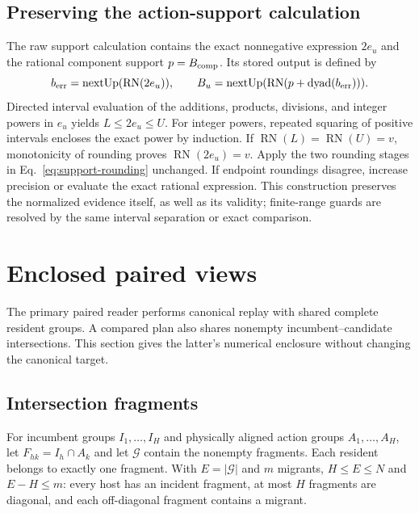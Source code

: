 \documentclass[11pt]{article}
\begin{document}
\subsection{Preserving the action-support calculation}
The raw support calculation contains the exact nonnegative expression $2e_u$ and the rational component support $p=B_{\rm comp}$. Its stored output is defined by
\begin{equation}
b_{\rm err}=\operatorname{nextUp}(\operatorname{RN}(2e_u)),\qquad
B_u=\operatorname{nextUp}(\operatorname{RN}(p+\operatorname{dyad}(b_{\rm err}))).
\label{eq:support-rounding}
\end{equation}
Directed interval evaluation of the additions, products, divisions, and integer powers in $e_u$ yields $L\le2e_u\le U$. For integer powers, repeated squaring of positive intervals encloses the exact power by induction. If $\operatorname{RN}(L)=\operatorname{RN}(U)=v$, monotonicity of rounding proves $\operatorname{RN}(2e_u)=v$. Apply the two rounding stages in Eq.~\eqref{eq:support-rounding} unchanged. If endpoint roundings disagree, increase precision or evaluate the exact rational expression. This construction preserves the normalized evidence itself, as well as its validity; finite-range guards are resolved by the same interval separation or exact comparison.

\section{Enclosed paired views}
The primary paired reader performs canonical replay with shared complete resident groups. A compared plan also shares nonempty incumbent--candidate intersections. This section gives the latter's numerical enclosure without changing the canonical target.

\subsection{Intersection fragments}
For incumbent groups $I_1,\ldots,I_H$ and physically aligned action groups $A_1,\ldots,A_H$, let $F_{hk}=I_h\cap A_k$ and let $\mathcal G$ contain the nonempty fragments. Each resident belongs to exactly one fragment. With $E=|\mathcal G|$ and $m$ migrants, $H\le E\le N$ and $E-H\le m$: every host has an incident fragment, at most $H$ fragments are diagonal, and each off-diagonal fragment contains a migrant.
\end{document}
